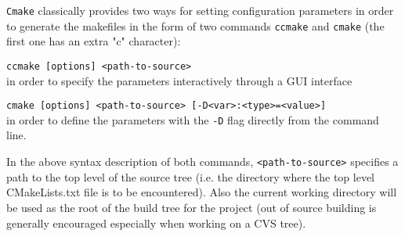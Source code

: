 \verb+Cmake+ classically provides two ways for setting configuration
parameters in order to generate the makefiles in the form of two
commands \verb+ccmake+ and \verb+cmake+ (the first one has an extra
"c" character):
\begin{description}
\item{\verb+ccmake [options] <path-to-source>+}\\ in order to specify
  the parameters interactively through a GUI interface
\item{\verb+cmake [options] <path-to-source> [-D<var>:<type>=<value>]+}\\ in
  order to define the parameters with the \verb+-D+ flag directly from
  the command line.
\end{description}
In the above syntax description of both commands,
{\verb+<path-to-source>+} specifies a path to the top level of the
source tree (i.e. the directory where the top level CMakeLists.txt
file is to be encountered). Also the current working directory will be
used as the root of the build tree for the project (out of source
building is generally encouraged especially when working on a CVS
tree).

